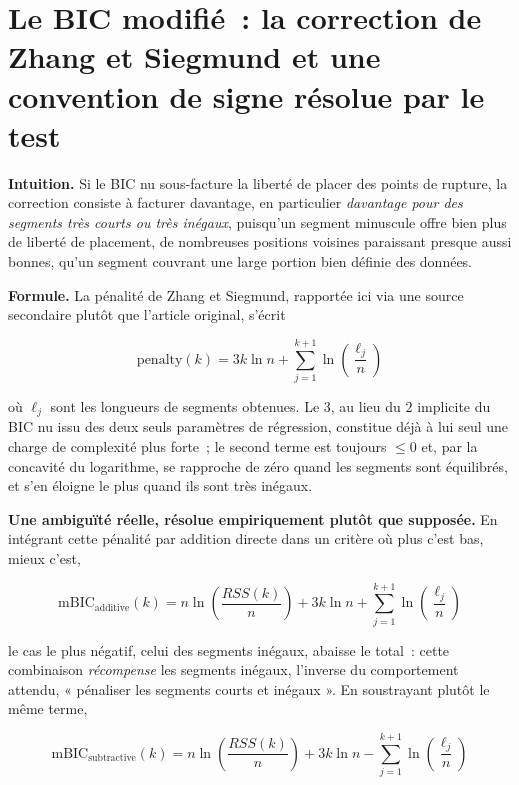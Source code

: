 \documentclass[11pt]{article}
\begin{document}
\section{Le BIC modifié~: la correction de Zhang et Siegmund et une convention de signe résolue par le test}

\textbf{Intuition.} Si le BIC nu sous-facture la liberté de placer des
points de rupture, la correction consiste à facturer davantage, en
particulier \emph{davantage pour des segments très courts ou très
inégaux}, puisqu'un segment minuscule offre bien plus de liberté de
placement, de nombreuses positions voisines paraissant presque aussi
bonnes, qu'un segment couvrant une large portion bien définie des données.

\textbf{Formule.} La pénalité de Zhang et Siegmund, rapportée ici via une
source secondaire plutôt que l'article original, s'écrit

\begin{equation}
\text{penalty}(k) = 3k \ln n + \sum_{j=1}^{k+1} \ln\!\left(\frac{\ell_j}{n}\right)
\end{equation}

où $\ell_j$ sont les longueurs de segments obtenues. Le $3$, au lieu du $2$
implicite du BIC nu issu des deux seuls paramètres de régression,
constitue déjà à lui seul une charge de complexité plus forte~; le second
terme est toujours $\le 0$ et, par la concavité du logarithme, se
rapproche de zéro quand les segments sont équilibrés, et s'en éloigne le
plus quand ils sont très inégaux.

\textbf{Une ambiguïté réelle, résolue empiriquement plutôt que supposée.}
En intégrant cette pénalité par addition directe dans un critère où plus
c'est bas, mieux c'est,

\begin{equation}
\mathrm{mBIC}_{\text{additive}}(k) = n \ln\!\left(\frac{RSS(k)}{n}\right) + 3k \ln n + \sum_{j=1}^{k+1} \ln\!\left(\frac{\ell_j}{n}\right)
\end{equation}

le cas le plus négatif, celui des segments inégaux, abaisse le total~:
cette combinaison \emph{récompense} les segments inégaux, l'inverse du
comportement attendu, « pénaliser les segments courts et inégaux ». En
soustrayant plutôt le même terme,

\begin{equation}
\mathrm{mBIC}_{\text{subtractive}}(k) = n \ln\!\left(\frac{RSS(k)}{n}\right) + 3k \ln n - \sum_{j=1}^{k+1} \ln\!\left(\frac{\ell_j}{n}\right)
\end{equation}
\end{document}
